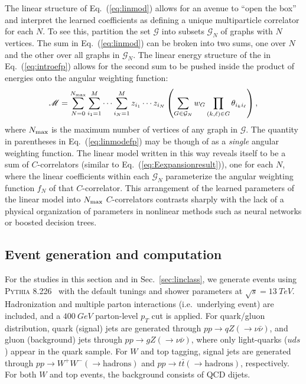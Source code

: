 \documentclass[letterpaper,11pt]{article}
\DeclareRobustCommand{\Sec}[1]{Sec.~\ref{#1}}
\DeclareRobustCommand{\Eq}[1]{Eq.~(\ref{#1})}
\newcommand{\B}{\text{EFP}\xspace}
\newcommand{\Bs}{\text{EFPs}\xspace}
\begin{document}
The linear structure of \Eq{eq:linmod} allows for an avenue to ``open the box'' and interpret the learned coefficients as defining a unique multiparticle correlator for each $N$. 
%
To see this, partition the set $\mathcal G$ into subsets $\mathcal G_N$ of graphs with $N$ vertices.
%
The sum in \Eq{eq:linmod} can be broken into two sums, one over $N$ and the other over all graphs in $\mathcal G_N$. 
%
The linear energy structure of the \Bs in \Eq{eq:introefp} allows for the second sum to be pushed inside the product of energies onto the angular weighting function:
\begin{equation}\label{eq:linmodefp}
\mathscr M=\sum_{N=0}^{N_{\rm max}}\sum_{i_1=1}^M\cdots\sum_{i_N=1}^Mz_{i_1}\cdots z_{i_N}\left(\sum_{G\in\mathcal G_N}w_G\prod_{(k,\ell)\in G}\theta_{i_ki_\ell}\right),
\end{equation}
where $N_{\rm max}$ is the maximum number of vertices of any graph in $\mathcal G$. 
%
The quantity in parentheses in \Eq{eq:linmodefp} may be though of as a \emph{single} angular weighting function. 
%
The linear model written in this way reveals itself to be a sum of $C$-correlators (similar to \Eq{eq:Eexpansionresult}), one for each $N$, where the linear coefficients within each $\mathcal G_N$ parameterize the angular weighting function $f_N$ of that $C$-correlator. 
%
This arrangement of the learned parameters of the linear model into $N_{\rm max}$ $C$-correlators contrasts sharply with the lack of a physical organization of parameters in nonlinear methods such as neural networks or boosted decision trees.


\subsection{Event generation and \B computation}
\label{sec:eventgen}

For the studies in this section and in \Sec{sec:linclass}, we generate events using \textsc{Pythia} 8.226~\cite{Sjostrand:2006za,Sjostrand:2007gs,Sjostrand:2014zea} with the default tunings and shower parameters at $\sqrt{s}=\SI{13}{TeV}$.
%
Hadronization and multiple parton interactions (i.e.\ underlying event) are included, and a $\SI{400}{GeV}$ parton-level $p_T$ cut is applied.
%
For quark/gluon distribution, quark (signal) jets are generated through $pp \to q Z(\to \nu\bar\nu)$, and gluon (background) jets through $pp \to g Z(\to \nu\bar\nu)$, where only light-quarks ($uds$) appear in the quark sample.
%
For $W$ and top tagging, signal jets are generated through $pp\to W^+W^-(\to\text{hadrons})$ and $pp\to t\bar t(\to\text{hadrons})$, respectively.
%
For both $W$ and top events, the background consists of QCD dijets.
\end{document}
